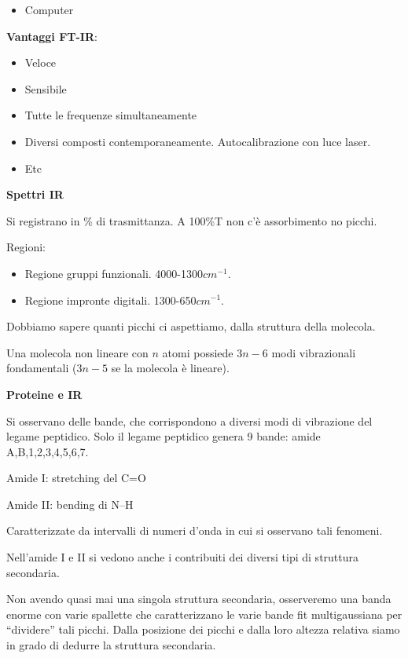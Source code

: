 \begin{itemize}
\item
  Computer
\end{itemize}

\textbf{Vantaggi FT-IR}:

\begin{itemize}
\item
  Veloce
\item
  Sensibile
\item
  Tutte le frequenze simultaneamente
\item
  Diversi composti contemporaneamente. Autocalibrazione con luce laser.
\item
  Etc
\end{itemize}

\textbf{Spettri IR}

Si registrano in \% di trasmittanza. A 100\%T non c'è assorbimento no
picchi.

Regioni:

\begin{itemize}
\item
  Regione gruppi funzionali. 4000-1300\(cm^{- 1}\).
\item
  Regione impronte digitali. 1300-650\(cm^{- 1}\).
\end{itemize}

Dobbiamo sapere quanti picchi ci aspettiamo, dalla struttura della
molecola.

Una molecola non lineare con \(n\) atomi possiede \(3n - 6\) modi
vibrazionali fondamentali (\(3n - 5\) se la molecola è lineare).

\textbf{Proteine e IR}

Si osservano delle bande, che corrispondono a diversi modi di vibrazione
del legame peptidico. Solo il legame peptidico genera 9 bande: amide
A,B,1,2,3,4,5,6,7.

Amide I: stretching del C=O

Amide II: bending di N--H

Caratterizzate da intervalli di numeri d'onda in cui si osservano tali
fenomeni.

Nell'amide I e II si vedono anche i contribuiti dei diversi tipi di
struttura secondaria.

Non avendo quasi mai una singola struttura secondaria, osserveremo una
banda enorme con varie spallette che caratterizzano le varie bande fit
multigaussiana per ``dividere'' tali picchi. Dalla posizione dei picchi
e dalla loro altezza relativa siamo in grado di dedurre la struttura
secondaria.

